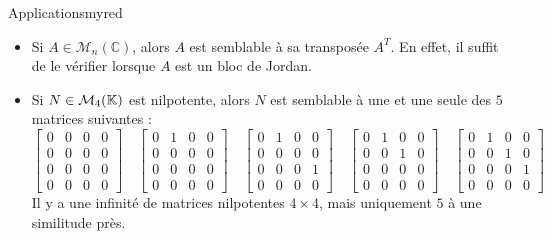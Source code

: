     \begin{omed}{Applications}{myred}
        \begin{itemize}
            \item Si $A \in \mathcal{M}_n(\mathbb{C})$, alors $A$ est semblable à sa transposée $A^{T}$. En effet, il suffit de le vérifier lorsque $A$ est un bloc de Jordan.
            \item Si $N \in \mathcal{M}_{4}(\mathbb{K})$ est nilpotente, alors $N$ est semblable à une et une seule des $5$ matrices suivantes :
            \[ \begin{bmatrix}
                0 & 0 & 0 & 0 \\
                0 & 0 & 0 & 0 \\
                0 & 0 & 0 & 0 \\
                0 & 0 & 0 & 0
            \end{bmatrix} \quad \begin{bmatrix}
                0 & 1 & 0 & 0 \\
                0 & 0 & 0 & 0 \\
                0 & 0 & 0 & 0 \\
                0 & 0 & 0 & 0
            \end{bmatrix} \quad \begin{bmatrix}
                0 & 1 & 0 & 0 \\
                0 & 0 & 0 & 0 \\
                0 & 0 & 0 & 1 \\
                0 & 0 & 0 & 0
            \end{bmatrix} \quad \begin{bmatrix}
                0 & 1 & 0 & 0 \\
                0 & 0 & 1 & 0 \\
                0 & 0 & 0 & 0 \\
                0 & 0 & 0 & 0
            \end{bmatrix} \quad \begin{bmatrix}
                0 & 1 & 0 & 0 \\
                0 & 0 & 1 & 0 \\
                0 & 0 & 0 & 1 \\
                0 & 0 & 0 & 0
            \end{bmatrix} \]   
            Il y a une infinité de matrices nilpotentes $4 \times 4$, mais uniquement $5$ à une similitude près.
        \end{itemize}
    \end{omed}

